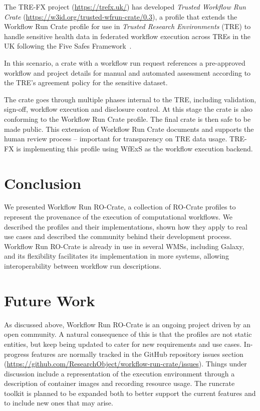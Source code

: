 \documentclass[10pt,letterpaper]{article}
\begin{document}
  The TRE-FX project (\url{https://trefx.uk/}) has developed \emph{Trusted Workflow Run Crate}
  (\url{https://w3id.org/trusted-wfrun-crate/0.3}), a profile that extends the Workflow Run Crate profile for use in
  \emph{Trusted Research Environments} (TRE) to handle sensitive health data in federated workflow execution across TREs in the UK following the Five Safes Framework~\cite{Desai et al 2016}.
  
  In this scenario, a crate with a workflow run request references a pre-approved workflow and project details for manual and automated assessment according to the TRE's agreement policy for the sensitive dataset.
  
  The crate goes through multiple phases internal to the TRE, including validation, sign-off, workflow execution and disclosure control.
  At this stage the crate is also conforming to the Workflow Run Crate profile.
  The final crate is then safe to be made public.
  This extension of Workflow Run Crate documents and supports the human review process --
  important for transparency on TRE data usage.
  TRE-FX is implementing this profile using WfExS as the workflow execution backend.
  
  

\hypertarget{conclusion}{%
\section{Conclusion}\label{conclusion}}

We presented Workflow Run RO-Crate, a collection of RO-Crate profiles to represent the provenance of the execution of computational workflows.
We described the profiles and their implementations, shown how they apply to real use cases and described the community behind their development process.
Workflow Run RO-Crate is already in use in several WMSs, including Galaxy, and its flexibility facilitates its implementation in more systems, allowing interoperability between workflow run descriptions.

\hypertarget{future-work}{%
\section{Future Work}\label{future-work}}

As discussed above, Workflow Run RO-Crate is an ongoing project driven by an open community.
A natural consequence of this is that the profiles are not static entities, but keep being updated to cater for new requirements and use cases.
In-progress features are normally tracked in the GitHub repository issues section (\url{https://github.com/ResearchObject/workflow-run-crate/issues}).
Things under discussion include a representation of the execution environment through a description of container images and recording resource usage.
The runcrate toolkit is planned to be expanded both to better support the current features and to include new ones that may arise.
\end{document}

